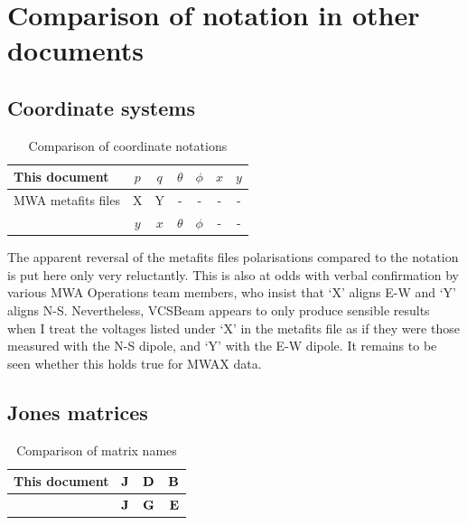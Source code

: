 \documentclass{book}
\newcommand{\vcsbeam}{{\sc VCSBeam}}
\begin{document}
\chapter{Comparison of notation in other documents}

\section{Coordinate systems}

\begin{table}[!hb]
    \centering
    \caption{Comparison of coordinate notations}
    \label{tbl:notations}
    \begin{tabular}{l|cc|cc|cc}
        This document & $p$ & $q$ & $\theta$ & $\phi$ & $x$ & $y$ \\
        \hline
        MWA metafits files       & X & Y & - & - & - & - \\
        \citet{Sokolowski2017} & $y$ & $x$ & $\theta$ & $\phi$ & - & - \\
    \end{tabular}
\end{table}

The apparent reversal of the metafits files polarisations compared to the \citet{Sokolowski2017} notation is put here only very reluctantly.
This is also at odds with verbal confirmation by various MWA Operations team members, who insist that `X' aligns E-W and `Y' aligns N-S.
Nevertheless, \vcsbeam{} appears to only produce sensible results when I treat the voltages listed under `X' in the metafits file as if they were those measured with the N-S dipole, and `Y' with the E-W dipole.
It remains to be seen whether this holds true for MWAX data.

\section{Jones matrices}

\begin{table}[!hb]
    \centering
    \caption{Comparison of matrix names}
    \label{tbl:notations}
    \begin{tabular}{l|ccc}
        This document & ${\bf J}$ & ${\bf D}$ & ${\bf B}$ \\
        \hline
        \citet{Sokolowski2017} & ${\bf J}$ & ${\bf G}$ & ${\bf E}$ \\
    \end{tabular}
\end{table}

\printindex


\end{document}
